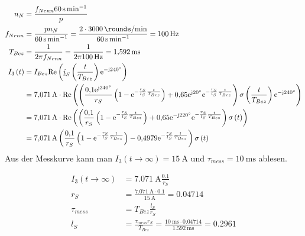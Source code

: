 \documentclass[11pt,a4paper]{scrartcl}
\newcommand{\mybr}[1]{\left(#1\right)}
\renewcommand{\j}{\mathrm{j}}
\renewcommand{\i}{\underline{i}}
\newcommand{\0}{_{\mybr{0}}}
\newcommand{\1}{_{\mybr{1}}}
\newcommand{\2}{_{\mybr{2}}}
\renewcommand{\e}{\mathrm{e}}
\renewcommand{\Re}{\mathrm{Re}}
\begin{document}
\section{}
\begin{align}
n_N&=\frac{f_{Nenn}\SI{60}{\second\per\minute}}{p}\\
f_{Nenn}&=\frac{p n_N}{\SI{60}{\second\per\minute}}=\frac{2\cdot\SI{3000}{\rounds\per\minute}}{\SI{60}{\second\per\minute}}=\SI{100}{\hertz}\\
T_{Bez}&=\frac{1}{2\pi f_{Nenn}}=\frac{1}{2\pi\SI{100}{\hertz}}=\SI{1.592}{\milli\second}\\
I_3\mybr{t}&=I_{Bez}\Re\mybr{\i_S\mybr{\frac{t}{T_{Bez}}}\e^{-\j\SI{240}{\degree}}}\\
&=\SI{7.071}{\ampere}\cdot\Re\mybr{\mybr{\frac{\num{0.1}\e^{\j\SI{240}{\degree}}}{r_S}\mybr{1-\e^{-\frac{r_S}{l_S}\frac{t}{T_{Bez}}}}+\num{0.65}\e^{\j\SI{20}{\degree}}\e^{-\frac{r_S}{l_S}\frac{t}{T_{Bez}}}}\sigma\mybr{\frac{t}{T_{Bez}}}\e^{-\j\SI{240}{\degree}}}\\
&=\SI{7.071}{\ampere}\cdot\Re\mybr{\mybr{\frac{\num{0.1}}{r_S}\mybr{1-\e^{-\frac{r_S}{l_S}\frac{t}{T_{Bez}}}}+\num{0.65}\e^{-\j\SI{220}{\degree}}\e^{-\frac{r_S}{l_S}\frac{t}{T_{Bez}}}}\sigma\mybr{t}}\\
&=\SI{7.071}{\ampere}\mybr{\frac{\num{0.1}}{r_S}\mybr{1-\e^{-\frac{r_S}{l_S}\frac{t}{T_{Bez}}}}-\num{0.4979}\e^{-\frac{r_S}{l_S}\frac{t}{T_{Bez}}}}\sigma\mybr{t}\\
\end{align}
Aus der Messkurve kann man $I_3\mybr{t\rightarrow\infty}=\SI{15}{\ampere}$ und $\tau_{mess}=\SI{10}{\milli\second}$ ablesen.
\begin{figure*}[!hp]
	\centering
\end{figure*}
\begin{align}
I_3\mybr{t\rightarrow\infty}&=\SI{7.071}{\ampere}\frac{\num{0.1}}{r_S}\\
r_S&=\frac{\SI{7.071}{\ampere}\cdot\num{0.1}}{\SI{15}{\ampere}}=\num{0.04714}\\
\tau_{mess}&=T_{Bez}\frac{l_S}{r_S}\\
l_S&=\frac{\tau_{mess}r_S}{T_{Bez}}=\frac{\SI{10}{\milli\second}\cdot\num{0.04714}}{\SI{1.592}{\milli\second}}=\num{0.2961}
\end{align}
\end{document}
